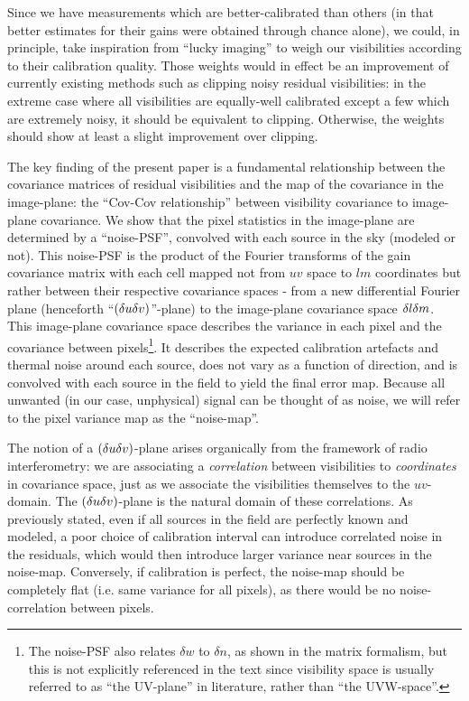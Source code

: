 \pg
Since we have measurements which are better-calibrated than others (in that better estimates for their gains were obtained through chance alone), we could, in principle, take inspiration from ``lucky imaging'' \citep[an optical-domain method for making good images: for more details, see][and references therein]{1978JOSA...68.1651F} to weigh our visibilities according to their calibration quality. 
{Those weights would in effect be an improvement of currently existing methods such as clipping noisy residual visibilities: in the extreme case where all visibilities are equally-well calibrated except a few which are extremely noisy, it should be equivalent to clipping. Otherwise, the weights should show at least a slight improvement over clipping.}

\pg
The key finding of the present paper is a fundamental relationship between the covariance matrices of residual visibilities and the map of the covariance in the image-plane: the ``Cov-Cov relationship'' between visibility covariance to image-plane covariance. We show that the pixel statistics in the image-plane are determined by a ``noise-PSF'', convolved with each source in the sky (modeled or not). This noise-PSF is the product of the Fourier transforms of the gain covariance matrix with each cell mapped not from $uv$ space to $lm$ coordinates but rather between their respective covariance spaces - from a new {differential Fourier plane (henceforth ``$\left(\delta u\delta v\right)$''-plane) to the image-plane covariance space $\delta l\delta m$. This image-plane covariance space describes} the variance in each pixel and the covariance between pixels\footnote{{The noise-PSF also relates $\delta w$ to $\delta n$, as shown in the matrix formalism, but this is not explicitly referenced in the text since visibility space is usually referred to as ``the UV-plane'' in literature, rather than ``the UVW-space''.}}. It describes the expected calibration artefacts and thermal noise around each source, does not vary as a function of direction, and is convolved with each source in the field to yield the final error map. Because all unwanted (in our case, unphysical) signal can be thought of as noise, we will refer to {the pixel variance map} as the ``noise-map''.

\pg
The notion of a $\left(\delta u\delta v\right)$-plane arises organically from the framework of radio interferometry: we are associating a \emph{correlation} between visibilities to \emph{coordinates} in covariance space, {just as we associate} the visibilities themselves to the $uv$-domain. The $\left(\delta u\delta v\right)$-plane is the natural domain of these correlations. As previously stated, even if all sources in the field are perfectly known and modeled, a poor choice of calibration interval can introduce correlated noise in the residuals, which would then introduce larger variance near sources in the noise-map. Conversely, if calibration is perfect, the noise-map should be completely flat {(i.e. same variance for all pixels)}, as there would be no noise-correlation between pixels.

